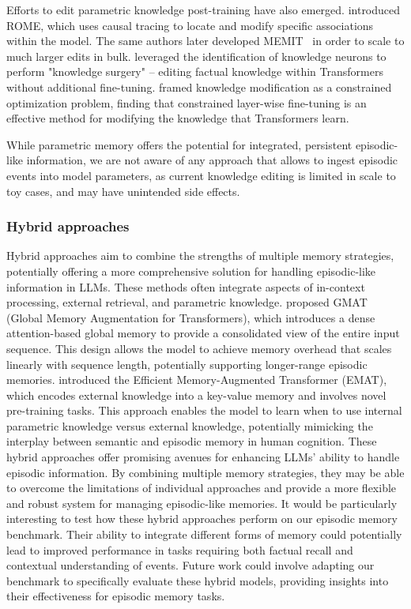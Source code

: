 \documentclass{article}
\begin{document}
Efforts to edit parametric knowledge post-training have also emerged. \citet{meng2022locating} introduced ROME, which uses causal tracing to locate and modify specific associations within the model. The same authors later developed MEMIT~\citep{Meng2022a} in order to scale to much larger edits in bulk. \citet{Dai2021} leveraged the identification of knowledge neurons to perform "knowledge surgery" – editing factual knowledge within Transformers without additional fine-tuning. \citet{Zhu2020} framed knowledge modification as a constrained optimization problem, finding that constrained layer-wise fine-tuning is an effective method for modifying the knowledge that Transformers learn.

While parametric memory offers the potential for integrated, persistent episodic-like information, we are not aware of any approach that allows to ingest episodic events into model parameters, as current knowledge editing is limited in scale to toy cases, and may have unintended side effects.

\subsubsection{Hybrid approaches}
Hybrid approaches aim to combine the strengths of multiple memory strategies, potentially offering a more comprehensive solution for handling episodic-like information in LLMs. These methods often integrate aspects of in-context processing, external retrieval, and parametric knowledge.
\citet{Gupta2020} proposed GMAT (Global Memory Augmentation for Transformers), which introduces a dense attention-based global memory to provide a consolidated view of the entire input sequence. This design allows the model to achieve memory overhead that scales linearly with sequence length, potentially supporting longer-range episodic memories.
\citet{Wu2022} introduced the Efficient Memory-Augmented Transformer (EMAT), which encodes external knowledge into a key-value memory and involves novel pre-training tasks. This approach enables the model to learn when to use internal parametric knowledge versus external knowledge, potentially mimicking the interplay between semantic and episodic memory in human cognition.
These hybrid approaches offer promising avenues for enhancing LLMs' ability to handle episodic information. By combining multiple memory strategies, they may be able to overcome the limitations of individual approaches and provide a more flexible and robust system for managing episodic-like memories.
It would be particularly interesting to test how these hybrid approaches perform on our episodic memory benchmark. Their ability to integrate different forms of memory could potentially lead to improved performance in tasks requiring both factual recall and contextual understanding of events. Future work could involve adapting our benchmark to specifically evaluate these hybrid models, providing insights into their effectiveness for episodic memory tasks.
\end{document}
